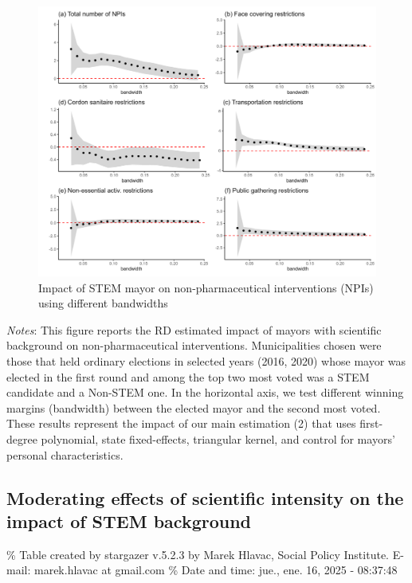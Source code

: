 \documentclass[
  letterpaper,
  DIV=11,
  numbers=noendperiod]{scrartcl}
\begin{document}
\begin{figure}[H]

\caption{Impact of STEM mayor on non-pharmaceutical interventions (NPIs)
using different bandwidths}

{\centering \includegraphics{outputs/figures/npi_rob.png}

}

\end{figure}%

\emph{Notes}: This figure reports the RD estimated impact of mayors with
scientific background on non-pharmaceutical interventions.
Municipalities chosen were those that held ordinary elections in
selected years (2016, 2020) whose mayor was elected in the first round
and among the top two most voted was a STEM candidate and a Non-STEM
one. In the horizontal axis, we test different winning margins
(bandwidth) between the elected mayor and the second most voted. These
results represent the impact of our main estimation (2) that uses
first-degree polynomial, state fixed-effects, triangular kernel, and
control for mayors' personal characteristics.

\subsection{Moderating effects of scientific intensity on the impact of
STEM
background}\label{moderating-effects-of-scientific-intensity-on-the-impact-of-stem-background}

\% Table created by stargazer v.5.2.3 by Marek Hlavac, Social Policy
Institute. E-mail: marek.hlavac at gmail.com \% Date and time: jue.,
ene. 16, 2025 - 08:37:48
\end{document}
